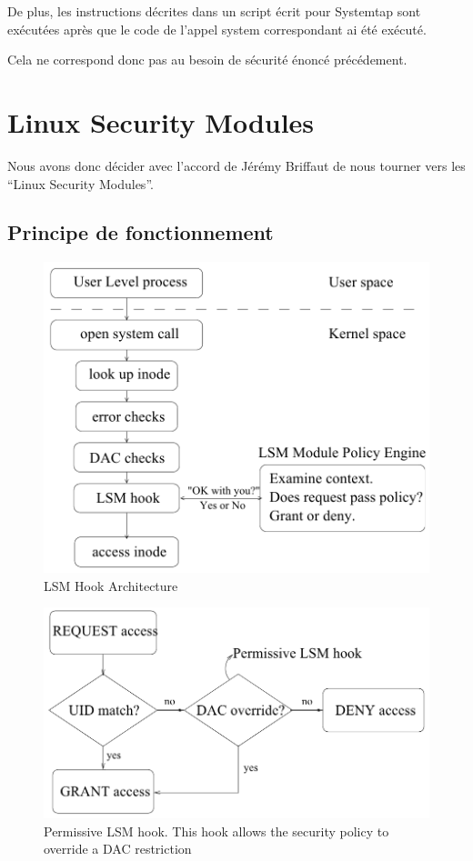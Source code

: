 \documentclass[pdftex,a4paper,titlepage,11pt,openright]{article}
\begin{document}
De plus, les instructions décrites dans un script écrit pour Systemtap sont exécutées après que le code de l'appel system correspondant ai été exécuté.


Cela ne correspond donc pas au besoin de sécurité énoncé précédement.


\newpage


\section{Linux Security Modules}

Nous avons donc décider avec l'accord de Jérémy Briffaut de nous tourner vers les ``Linux Security Modules''.

\subsection{Principe de fonctionnement}

\begin{figure}[hb]
	\centering
	\includegraphics[scale=0.45]{lsm1.png}
	\caption{LSM Hook Architecture \cite{LSMINTRO}}
\end{figure}

\begin{figure}[hb]
	\centering
	\includegraphics[scale=0.45]{lsm2.png}
	\caption{Permissive LSM hook. This hook allows the security policy to override a DAC restriction \cite{LSMINTRO}}
\end{figure}
\end{document}
